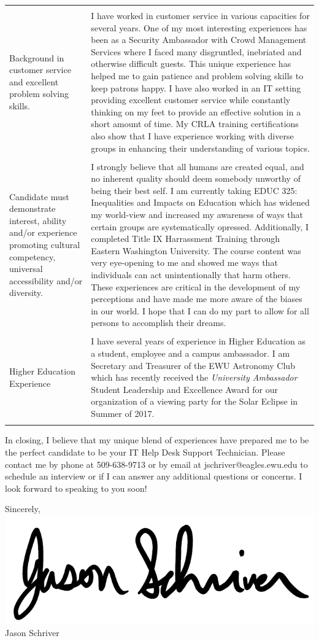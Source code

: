 \documentclass[a4paper,10pt]{article}
\begin{document}
\begin{longtable}{|p{.35\linewidth}|p{.6\linewidth}|}
	&\\
	Background in customer service and excellent problem solving skills.
	& I have worked in customer service in various capacities for several years. One of my most interesting experiences has been as a Security Ambassador with Crowd Management Services where I faced many disgruntled, inebriated and otherwise difficult guests. This unique experience has helped me to gain patience and problem solving skills to keep patrons happy. I have also worked in an IT setting providing excellent customer service while constantly thinking on my feet to provide an effective solution in a short amount of time. My CRLA training certifications also show that I have experience working with diverse groups in enhancing their understanding of various topics.\\
	&\\
	Candidate must demonstrate interest, ability and/or experience promoting cultural competency, universal accessibility and/or diversity.
	& I strongly believe that all humans are created equal, and no inherent quality should deem somebody unworthy of being their best self. I am currently taking EDUC 325: Inequalities and Impacts on Education which has widened my world-view and increased my awareness of ways that certain groups are systematically opressed. Additionally, I completed Title IX Harrassment Training through Eastern Washington University. The course content was very eye-opening to me and showed me ways that individuals can act unintentionally that harm others. These experiences are critical in the development of my perceptions and have made me more aware of the biases in our world. I hope that I can do my part to allow for all persons to accomplish their dreams.\\
	&\\
	Higher Education Experience & I have several years of experience in Higher Education as a student, employee and a campus ambassador. I am Secretary and Treasurer of the EWU Astronomy Club which has recently received the \textit{University Ambassador} Student Leadership and Excellence Award for our organization of a viewing party for the Solar Eclipse in Summer of 2017.\\
	&\\
	
\end{longtable}
\par
In closing, I believe that my unique blend of experiences have prepared me to be the perfect candidate to be your IT Help Desk Support Technician. Please contact me by phone at 509-638-9713 or by email at jschriver@eagles.ewu.edu to schedule an interview or if I can answer any additional questions or concerns. I look forward to speaking to you soon!
\par
Sincerely,\\
\includegraphics[scale=.25]{signature}\\
Jason Schriver

\end{document}

